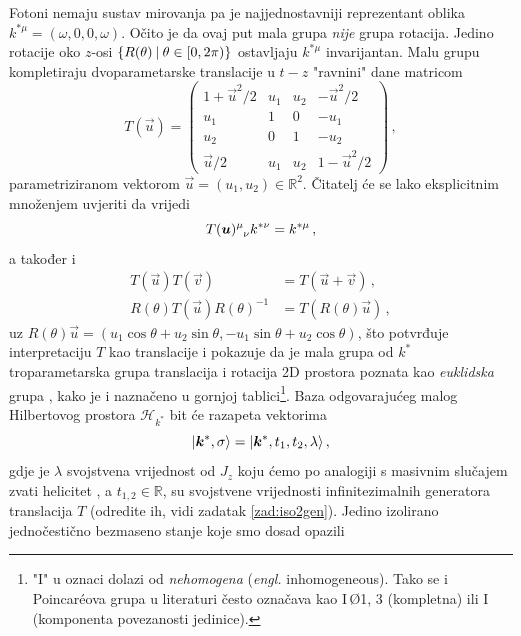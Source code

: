 Fotoni nemaju sustav mirovanja pa je najjednostavniji reprezentant
oblika $k^{*\mu} = (\omega, 0, 0, \omega)$. Očito je da ovaj put
mala grupa \emph{nije} grupa rotacija. Jedino rotacije oko $z$-osi
$\{R(\theta) \: | \: \theta \in [0, 2\pi)\}$ ostavljaju $k^{*\mu}$
invarijantan. Malu grupu kompletiraju dvoparametarske translacije
u $t-z$ "ravnini" dane matricom
\begin{equation}
  T(\vec{u}) = \begin{pmatrix}
      1+\vec{u}^2/2 & u_1 & u_2 & -\vec{u}^2/2 \\
u_1 & 1 & 0 & -u_1 \\
u_2 & 0 & 1 & -u_2 \\
\vec{u}/2 & u_1 & u_2 & 1-\vec{u}^2/2
  \end{pmatrix} \,,
    \label{eq:defTu}
\end{equation}
parametriziranom vektorom $\vec{u} = (u_1, u_2) \in \mathbb{R}^2$.
Čitatelj će se lako eksplicitnim množenjem uvjeriti da vrijedi
\begin{equation}
    \tensor{T(\vec{u})}{^{\mu}_{\nu}} k^{*\nu} = k^{*\mu} \,,
\end{equation}
a također i
\begin{align}
    T(\vec{u}) T(\vec{v}) &= T(\vec{u} + \vec{v}) \,, \\
    R(\theta) T(\vec{u}) R(\theta)^{-1} &= T(R(\theta)\vec{u}) \,,
\end{align}
uz $R(\theta)\vec{u} = (u_1\cos\theta + u_2 \sin\theta, -u_1\sin\theta+u_2\cos\theta)$,
što potvrđuje interpretaciju $T$ kao translacije i pokazuje da je mala grupa 
od $k^{*}$ troparametarska grupa translacija i rotacija 2D prostora poznata
kao \emph{euklidska} grupa , kako je i naznačeno u gornjoj tablici\footnote{"I"
    u oznaci
 dolazi od \emph{nehomogena} (\emph{engl.} inhomogeneous). Tako
se i Poincar\'{e}ova grupa u literaturi često označava
kao I$\,$\O{1, 3} (kompletna) ili  I$\,$ (komponenta
povezanosti jedinice).}.
Baza odgovarajućeg malog Hilbertovog prostora $\mathcal{H}_{k^*}$ bit
će razapeta vektorima
\begin{equation}
  \ket{\vec{k}^{*}, \sigma} = \ket{\vec{k}^{*}, t_1, t_{2}, \lambda} \,,
\end{equation}
gdje je $\lambda$ svojstvena vrijednost od $J_z$ koju ćemo po analogiji
s masivnim slučajem zvati helicitet , a $t_{1,2}\in\mathbb{R}$,
su svojstvene
vrijednosti infinitezimalnih generatora translacija $T$ (odredite ih, vidi
zadatak \ref{zad:iso2gen}).
Jedino izolirano jednočestično bezmaseno stanje koje smo dosad opazili
